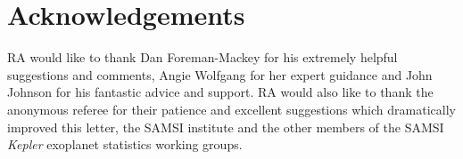 \acknowledgements
\section*{Acknowledgements}

RA would like to thank Dan Foreman-Mackey for his extremely helpful suggestions
and comments, Angie Wolfgang for her expert guidance and John Johnson for his
fantastic advice and support.
RA would also like to thank the anonymous referee for their patience and
excellent suggestions which dramatically improved this letter, the SAMSI
institute and the other members of the SAMSI {\it Kepler} exoplanet statistics
working groups.


